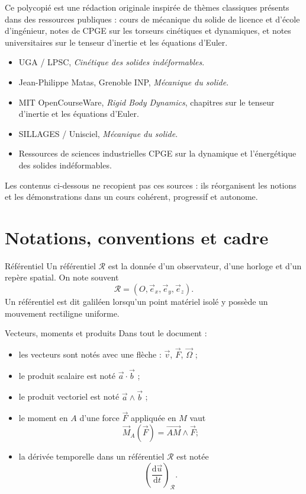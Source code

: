 \documentclass[11pt,a4paper]{article}
\newcommand{\vect}[1]{\overrightarrow{#1}}
\newcommand{\der}[2]{\frac{\mathrm{d}#1}{\mathrm{d}#2}}
\newcommand{\Rep}{\mathcal R}
\begin{document}
Ce polycopié est une rédaction originale inspirée de thèmes classiques présents dans des ressources publiques :
cours de mécanique du solide de licence et d'école d'ingénieur, notes de CPGE sur les torseurs cinétiques et dynamiques, et notes universitaires sur le tenseur d'inertie et les équations d'Euler.

\begin{itemize}
  \item UGA / LPSC, \emph{Cinétique des solides indéformables}.
  \item Jean-Philippe Matas, Grenoble INP, \emph{Mécanique du solide}.
  \item MIT OpenCourseWare, \emph{Rigid Body Dynamics}, chapitres sur le tenseur d'inertie et les équations d'Euler.
  \item SILLAGES / Unisciel, \emph{Mécanique du solide}.
  \item Ressources de sciences industrielles CPGE sur la dynamique et l'énergétique des solides indéformables.
\end{itemize}

Les contenus ci-dessous ne recopient pas ces sources : ils réorganisent les notions et les démonstrations dans un cours cohérent, progressif et autonome.

\newpage

\section{Notations, conventions et cadre}

\begin{definitionbox}{Référentiel}{}
Un référentiel $\Rep$ est la donnée d'un observateur, d'une horloge et d'un repère spatial.
On note souvent
\[
\Rep=(O,\vec e_x,\vec e_y,\vec e_z).
\]
Un référentiel est dit galiléen lorsqu'un point matériel isolé y possède un mouvement rectiligne uniforme.
\end{definitionbox}

\begin{definitionbox}{Vecteurs, moments et produits}{}
Dans tout le document :
\begin{itemize}
  \item les vecteurs sont notés avec une flèche : $\vec v$, $\vec F$, $\vec \Omega$ ;
  \item le produit scalaire est noté $\vec a\cdot\vec b$ ;
  \item le produit vectoriel est noté $\vec a\wedge\vec b$ ;
  \item le moment en $A$ d'une force $\vec F$ appliquée en $M$ vaut
  \[
  \vec M_A(\vec F)=\vect{AM}\wedge \vec F ;
  \]
  \item la dérivée temporelle dans un référentiel $\Rep$ est notée
  \[
  \left(\der{\vec u}{t}\right)_{\Rep}.
  \]
\end{itemize}
\end{definitionbox}
\end{document}
